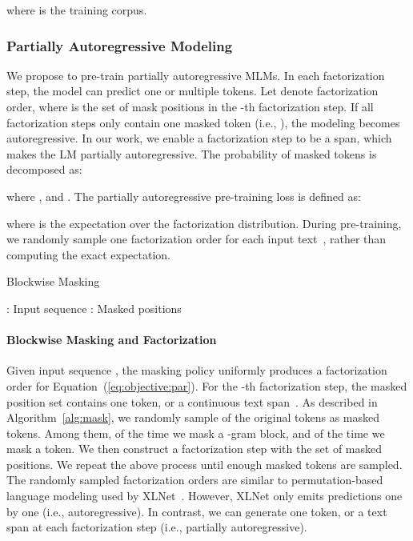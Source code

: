 \documentclass{article}
\newcommand{\eqform}[1]{Equation~(\ref{#1})}
\newcommand*\AlgCommentInLine[1]{{\color{deepblue}{ \textit{#1}}}}
\begin{document}
where  is the training corpus.


\subsubsection{Partially Autoregressive Modeling}
\label{sec:par}

We propose to pre-train partially autoregressive MLMs. In each factorization step, the model can predict one or multiple tokens. Let  denote factorization order, where  is the set of mask positions in the -th factorization step.
If all factorization steps only contain one masked token (i.e., ), the modeling becomes autoregressive.
In our work, we enable a factorization step to be a span, which makes the LM partially autoregressive.
The probability of masked tokens is decomposed as:

where , and .
The partially autoregressive pre-training loss is defined as:

where  is the expectation over the factorization distribution.
During pre-training, we randomly sample one factorization order  for each input text~\cite{xlnet}, rather than computing the exact expectation.


\begin{algorithm}[tb]
\centering
\small
\caption{Blockwise Masking}
\label{alg:mask}
\begin{algorithmic}
 : Input sequence
 : Masked positions

\STATE {}
\REPEAT{}
\hfill\AlgCommentInLine{Randomly sample an index}
\STATE{~~~~}
\UNTIL{}\hfill\AlgCommentInLine{Masking ratio is }
\end{algorithmic}
\end{algorithm}

\paragraph{Blockwise Masking and Factorization}
Given input sequence , the masking policy uniformly produces a factorization order  for \eqform{eq:objective:par}.
For the -th factorization step, the masked position set  contains one token, or a continuous text span~\cite{spanbert}.
As described in Algorithm~\ref{alg:mask}, we randomly sample  of the original tokens as masked tokens.
Among them,  of the time we mask a -gram block, and  of the time we mask a token. We then construct a factorization step with the set of masked positions.
We repeat the above process until enough masked tokens are sampled.
The randomly sampled factorization orders are similar to permutation-based language modeling used by XLNet~\cite{xlnet}. However, XLNet only emits predictions one by one (i.e., autoregressive).
In contrast, we can generate one token, or a text span at each factorization step (i.e., partially autoregressive).
\end{document}
